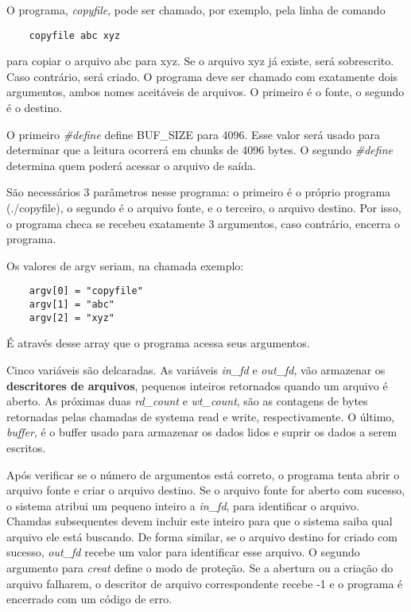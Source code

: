 \documentclass[10pt]{article}
\begin{document}
 O programa, \textit{copyfile}, pode ser chamado, por exemplo, pela linha de comando
 \begin{lstlisting}
    copyfile abc xyz
 \end{lstlisting}
 para copiar o arquivo abc para xyz. Se o arquivo xyz já existe, será sobrescrito. 
 Caso contrário, será criado. O programa deve ser chamado com exatamente dois argumentos,
 ambos nomes aceitáveis de arquivos. O primeiro é o fonte, o segundo é o destino.

 O primeiro \textit{\#define} define BUF\_SIZE para 4096. Esse valor será usado para determinar
 que a leitura ocorrerá em chunks de 4096 bytes. O segundo \textit{\#define} determina quem
 poderá acessar o arquivo de saída.

 São necessários 3 parâmetros nesse programa: o primeiro é o próprio programa (./copyfile),
 o segundo é o arquivo fonte, e o terceiro, o arquivo destino. Por isso, o programa checa
 se recebeu exatamente 3 argumentos, caso contrário, encerra o programa.

 Os valores de argv seriam, na chamada exemplo:

 \begin{lstlisting}
    argv[0] = "copyfile"
    argv[1] = "abc"
    argv[2] = "xyz"
 \end{lstlisting}
 É através desse array que o programa acessa seus argumentos.

 Cinco variáveis são delcaradas. As variáveis \textit{in\_fd} e \textit{out\_fd}, vão
 armazenar os \textbf{descritores de arquivos}, pequenos inteiros retornados quando 
 um arquivo é aberto. As próximas duas \textit{rd\_count} e \textit{wt\_count}, são as
 contagens de bytes retornadas pelas chamadas de systema read e write, respectivamente.
 O último, \textit{buffer}, é o buffer usado para armazenar os dados lidos e suprir
 os dados a serem escritos.

 Após verificar se o número de argumentos está correto, o programa tenta abrir
 o arquivo fonte e criar o arquivo destino. Se o arquivo fonte for aberto com 
 sucesso, o sistema atribui um pequeno inteiro a \textit{in\_fd}, para identificar
 o arquivo. Chamdas subsequentes devem incluir este inteiro para que o sistema
 saiba qual arquivo ele está buscando. De forma similar, se o arquivo destino
 for criado com sucesso, \textit{out\_fd} recebe um valor para identificar esse
 arquivo. O segundo argumento para \textit{creat} define o modo de proteção. Se 
 a abertura ou a criação do arquivo falharem, o descritor de arquivo correspondente
 recebe -1 e o programa é encerrado com um código de erro.
\end{document}
